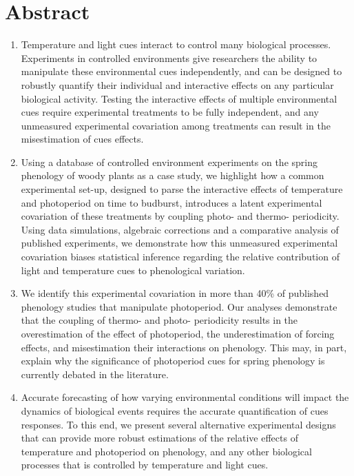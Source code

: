 \documentclass[11pt]{article}
\begin{document}
\section*{Abstract}
\begin{enumerate}
\item Temperature and light cues interact to control many biological processes. Experiments in controlled environments give researchers the ability to manipulate these environmental cues independently, and can be designed to robustly quantify their individual and interactive effects on any particular biological activity. Testing the interactive effects of multiple environmental cues require experimental treatments to be fully independent, and any unmeasured experimental covariation among treatments can result in the misestimation of cues effects. 

\item  Using a database of controlled environment experiments on the spring phenology of woody plants as a case study, we highlight how a common experimental set-up, designed to parse the interactive effects of temperature and photoperiod on time to budburst, introduces a latent experimental covariation of these treatments by coupling photo- and thermo- periodicity. Using data simulations, algebraic corrections and a comparative analysis of published experiments, we demonstrate how this unmeasured experimental covariation biases statistical inference regarding the relative contribution of light and temperature cues to phenological variation.

\item We identify this experimental covariation in more than 40\% of published phenology studies that manipulate photoperiod. Our analyses demonstrate that the coupling of thermo- and photo- periodicity results in the overestimation of the effect of photoperiod, the underestimation of forcing effects, and misestimation their interactions on phenology. This may, in part, explain why the significance of photoperiod cues for spring phenology is currently debated in the literature.

\item Accurate forecasting of how varying environmental conditions will impact the dynamics of biological events requires the accurate quantification of cues responses. To this end, we present several alternative experimental designs that can provide more robust estimations of the relative effects of temperature and photoperiod on phenology, and any other biological processes that is controlled by temperature and light cues.
\end{enumerate}
\end{document}
